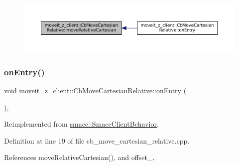 \nopagebreak
\begin{figure}[H]
\begin{center}
\leavevmode
\includegraphics[width=350pt]{classmoveit__z__client_1_1CbMoveCartesianRelative_aeffc7467b010f64ace4c7e7f699e6055_icgraph}
\end{center}
\end{figure}
\mbox{\label{classmoveit__z__client_1_1CbMoveCartesianRelative_aaea0e6c7431f93301a77269b8fa539f8}} 
\subsubsection{\texorpdfstring{on\+Entry()}{onEntry()}}
{\footnotesize\ttfamily void moveit\+\_\+z\+\_\+client\+::\+Cb\+Move\+Cartesian\+Relative\+::on\+Entry (\begin{DoxyParamCaption}{ }\end{DoxyParamCaption})\hspace{0.3cm}{\ttfamily [override]}, {\ttfamily [virtual]}}



Reimplemented from \hyperlink{classsmacc_1_1SmaccClientBehavior_a7962382f93987c720ad432fef55b123f}{smacc\+::\+Smacc\+Client\+Behavior}.



Definition at line 19 of file cb\+\_\+move\+\_\+cartesian\+\_\+relative.\+cpp.



References move\+Relative\+Cartesian(), and offset\+\_\+.


